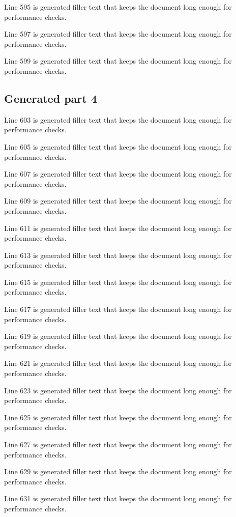 Line 595 is generated filler text that keeps the document long enough for performance checks.

Line 597 is generated filler text that keeps the document long enough for performance checks.

Line 599 is generated filler text that keeps the document long enough for performance checks.

\subsection{Generated part 4}

Line 603 is generated filler text that keeps the document long enough for performance checks.

Line 605 is generated filler text that keeps the document long enough for performance checks.

Line 607 is generated filler text that keeps the document long enough for performance checks.

Line 609 is generated filler text that keeps the document long enough for performance checks.

Line 611 is generated filler text that keeps the document long enough for performance checks.

Line 613 is generated filler text that keeps the document long enough for performance checks.

Line 615 is generated filler text that keeps the document long enough for performance checks.

Line 617 is generated filler text that keeps the document long enough for performance checks.

Line 619 is generated filler text that keeps the document long enough for performance checks.

Line 621 is generated filler text that keeps the document long enough for performance checks.

Line 623 is generated filler text that keeps the document long enough for performance checks.

Line 625 is generated filler text that keeps the document long enough for performance checks.

Line 627 is generated filler text that keeps the document long enough for performance checks.

Line 629 is generated filler text that keeps the document long enough for performance checks.

Line 631 is generated filler text that keeps the document long enough for performance checks.

